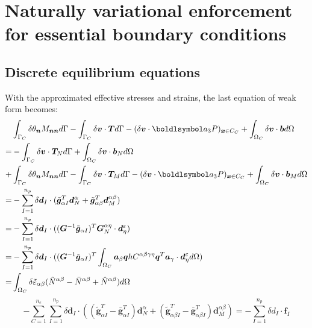 \section{Naturally variational enforcement for essential boundary conditions}\label{boundary}
\subsection{Discrete equilibrium equations}
With the approximated effective stresses and strains, the last equation of weak form becomes:
\begin{equation}
\begin{split}
&\int_{\Gamma_C} \delta \theta_{\boldsymbol n} M_{\boldsymbol{nn}} d\Gamma 
- \int_{\Gamma_C} \delta \boldsymbol v \cdot \boldsymbol T d\Gamma 
- (\delta \boldsymbol v \cdot \boldlsymbol a_3 P)_{\boldsymbol x\in C_C} 
+ \int_{\Omega_C} \delta \boldsymbol v \cdot \boldsymbol b d\Omega \\
= & - \int_{\Gamma_C} \delta \boldsymbol v \cdot \boldsymbol T_N d\Gamma 
+ \int_{\Omega_C} \delta \boldsymbol v \cdot \boldsymbol b_N d\Omega \\
+&\int_{\Gamma_C} \delta \theta_{\boldsymbol n} M_{\boldsymbol{nn}} d\Gamma 
- \int_{\Gamma_C} \delta \boldsymbol v \cdot \boldsymbol T_M d\Gamma 
- (\delta \boldsymbol v \cdot \boldlsymbol a_3 P)_{\boldsymbol x\in C_C} 
+ \int_{\Omega_C} \delta \boldsymbol v \cdot \boldsymbol b_M d\Omega \\
=& -\sum_{I=1}^{n_p} \delta \boldsymbol d_I \cdot (
\tilde{\boldsymbol g}_{\alpha I}^T \boldsymbol d^\alpha_N + \tilde{\boldsymbol g}_{\alpha\beta}^T \boldsymbol d^{\alpha\beta}_M) \\
=& -\sum_{I=1}^{n_p} \delta \boldsymbol d_I \cdot (
(\boldsymbol G^{-1}\tilde{\boldsymbol g}_{\alpha I})^T \boldsymbol G^{\alpha\eta}_N \cdot \boldsymbol d^\varepsilon_\eta) \\
=& -\sum_{I=1}^{n_p} \delta \boldsymbol d_I \cdot (
(\boldsymbol G^{-1}\tilde{\boldsymbol g}_{\alpha I})^T \int_{\Omega_C} \boldsymbol a_\beta \boldsymbol q h C^{\alpha\beta\gamma\eta} \boldsymbol q^T \boldsymbol a_\gamma \cdot \boldsymbol d^\varepsilon_\eta d\Omega) \\
= &\int_{\Omega_C} \delta \tilde \varepsilon_{\alpha\beta} (\tilde N^{\alpha\beta} - \bar N^{\alpha\beta} + \hat N^{\alpha\beta}) d\Omega
\end{split}
\end{equation}
\begin{equation}\label{w51}
- \sum_{C=1}^{n_e}\sum_{I=1}^{n_p} \delta \boldsymbol d_I \cdot \left ( (\tilde{\boldsymbol g}^T_{\alpha I} - \bar{\boldsymbol g}^T_{\alpha I}) \boldsymbol d_N^{\alpha}
+ (\tilde{\boldsymbol g}^T_{\alpha\beta I} - \bar{\boldsymbol g}^T_{\alpha\beta I}) \boldsymbol d_M^{\alpha\beta} \right ) = - \sum_{I=1}^{n_p}\delta d_I \cdot \boldsymbol f_I
\end{equation}
